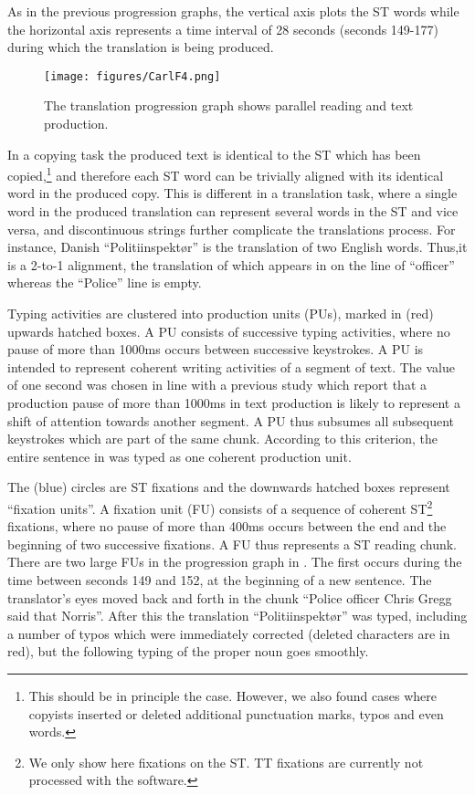 \documentclass[output=paper]{LSP/langsci}
\begin{document}
\newpage 
As in the previous progression graphs, the vertical axis plots the ST words while the horizontal axis represents a time interval of 28 seconds (seconds 149-177) during which the translation is being produced.

\begin{figure}
\texttt{[image: figures/CarlF4.png]}
\caption{The translation progression graph shows parallel reading and text production.}
\label{fig:carl:4}
\end{figure}

In a copying task the produced text is identical to the ST which has been copied,\footnote{This should be in principle the case. However, we also found cases where copyists inserted or deleted additional punctuation marks, typos and even words.} and therefore each ST word can be trivially aligned with its identical word in the produced copy. This is different in a translation task, where a single word in the produced translation can represent several words in the ST and vice versa, and discontinuous strings further complicate the translations process. For instance, Danish ``Politiinspektør'' is the translation of two English words. Thus,it is a 2-to-1 alignment, the translation of which appears in  on the line of ``officer'' whereas the ``Police'' line is empty.

Typing activities are clustered into production units (PUs), marked in (red) upwards hatched boxes. A PU consists of successive typing activities, where no pause of more than 1000ms occurs between successive keystrokes. A PU is intended to represent coherent writing activities of a segment of text. The value of one second was chosen in line with a previous study \citep{Carl2011} which report that a production pause of more than 1000ms in text production is likely to represent a shift of attention towards another segment. A PU thus subsumes all subsequent keystrokes which are part of the same chunk. According to this criterion, the entire sentence in  was typed as one coherent production unit.

\newpage 
The (blue) circles are ST fixations and the downwards hatched boxes represent ``fixation units''. A fixation unit (FU) consists of a sequence of coherent ST\footnote{We only show here fixations on the ST. TT fixations are currently not processed with the software.} fixations, where no pause of more than 400ms occurs between the end and the beginning of two successive fixations. A FU thus represents a ST reading chunk. There are two large FUs in the progression graph in . The first occurs during the time between seconds 149 and 152, at the beginning of a new sentence. The translator's eyes moved back and forth in the chunk ``Police officer Chris Gregg said that Norris''. After this the translation ``Politiinspektør'' was typed, including a number of typos which were immediately corrected (deleted characters are in red), but the following typing of the proper noun goes smoothly.  
\end{document}
